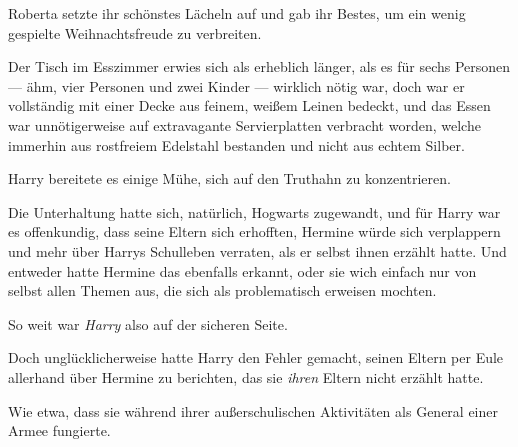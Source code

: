 Roberta setzte ihr schönstes Lächeln auf und gab ihr Bestes, um ein wenig gespielte Weihnachtsfreude zu verbreiten.

\later

Der Tisch im Esszimmer erwies sich als erheblich länger, als es für sechs Personen — ähm, vier Personen und zwei Kinder — wirklich nötig war, doch war er vollständig mit einer Decke aus feinem, weißem Leinen bedeckt, und das Essen war unnötigerweise auf extravagante Servierplatten verbracht worden, welche immerhin aus rostfreiem Edelstahl bestanden und nicht aus echtem Silber.

Harry bereitete es einige Mühe, sich auf den Truthahn zu konzentrieren.

Die Unterhaltung hatte sich, natürlich, Hogwarts zugewandt, und für Harry war es offenkundig, dass seine Eltern sich erhofften, Hermine würde sich verplappern und mehr über Harrys Schulleben verraten, als er selbst ihnen erzählt hatte. Und entweder hatte Hermine das ebenfalls erkannt, oder sie wich einfach nur von selbst allen Themen aus, die sich als problematisch erweisen mochten.

So weit war \emph{Harry} also auf der sicheren Seite.

Doch unglücklicherweise hatte Harry den Fehler gemacht, seinen Eltern per Eule allerhand über Hermine zu berichten, das sie \emph{ihren} Eltern nicht erzählt hatte.

Wie etwa, dass sie während ihrer außerschulischen Aktivitäten als General einer Armee fungierte.

